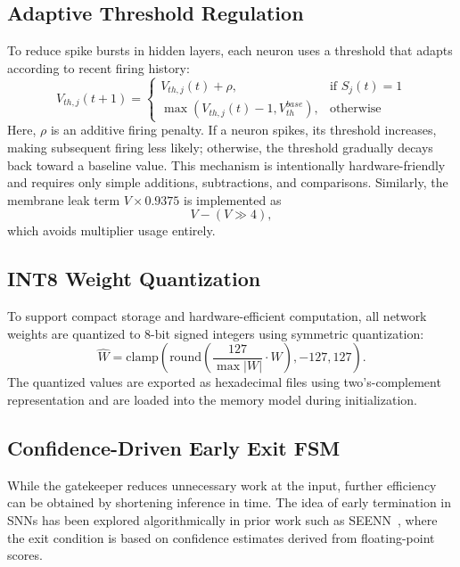 \documentclass[conference]{IEEEtran}
\begin{document}
\subsection{Adaptive Threshold Regulation}
To reduce spike bursts in hidden layers, each neuron uses a threshold that adapts according to recent firing history:
\begin{equation}
V_{th,j}(t{+}1) = 
\begin{cases}
V_{th,j}(t) + \rho, & \text{if } S_j(t) = 1 \\
\max(V_{th,j}(t) - 1, V_{th}^{base}), & \text{otherwise}
\end{cases}
\end{equation}
Here, $\rho$ is an additive firing penalty. If a neuron spikes, its threshold increases, making subsequent firing less likely; otherwise, the threshold gradually decays back toward a baseline value. This mechanism is intentionally hardware-friendly and requires only simple additions, subtractions, and comparisons. Similarly, the membrane leak term $V \times 0.9375$ is implemented as
\begin{equation}
V - (V \gg 4),
\end{equation}
which avoids multiplier usage entirely.

\subsection{INT8 Weight Quantization}
To support compact storage and hardware-efficient computation, all network weights are quantized to 8-bit signed integers using symmetric quantization:
\begin{equation}
\hat{W} = \text{clamp}\!\left(\text{round}\left( \frac{127}{\max|W|} \cdot W \right), -127, 127 \right).
\end{equation}
The quantized values are exported as hexadecimal files using two's-complement representation and are loaded into the memory model during initialization.

\subsection{Confidence-Driven Early Exit FSM}
While the gatekeeper reduces unnecessary work at the input, further efficiency can be obtained by shortening inference in time. The idea of early termination in SNNs has been explored algorithmically in prior work such as SEENN~\cite{li2023seenn}, where the exit condition is based on confidence estimates derived from floating-point scores.
\end{document}
